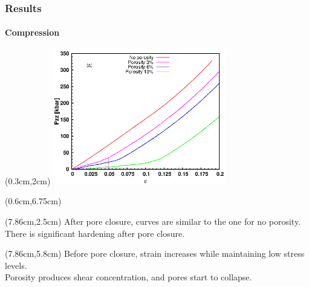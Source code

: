 \begin{frame}
    \frametitle{Results}
    \framesubtitle{Compression}
    \begin{textblock*}{7.5cm}(0.3cm,2cm) %
        \includegraphics[width=7.5cm]{Presentacion_PANACM_Franco/Pzz_strain_comp_dash.eps}
    \end{textblock*}
    \begin{textblock*}{4.2cm}(0.6cm,6.75cm) %
    \end{textblock*}
    \begin{textblock*}{5cm}(7.86cm,2.5cm) %
        After pore closure, curves are similar to the one for no porosity. There is significant hardening after pore closure.
    \end{textblock*}
    \begin{textblock*}{5cm}(7.86cm,5.8cm) %
        Before pore closure, strain increases while maintaining low stress levels.\\
        Porosity produces shear concentration, and pores start to collapse.
    \end{textblock*}
\end{frame}


